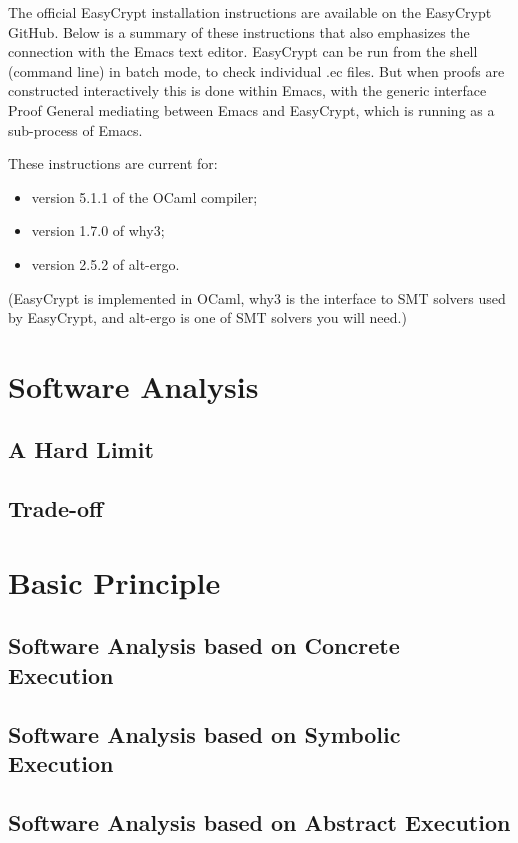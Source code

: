
\cite{StoughtonEasyCrypt}

The official EasyCrypt installation instructions are available on the EasyCrypt GitHub. Below is a summary of these instructions that also emphasizes the connection with the Emacs text editor. EasyCrypt can be run from the shell (command line) in batch mode, to check individual .ec files. But when proofs are constructed interactively this is done within Emacs, with the generic interface Proof General mediating between Emacs and EasyCrypt, which is running as a sub-process of Emacs.

These instructions are current for:
\begin{itemize}
	\item version 5.1.1 of the OCaml compiler;
	\item version 1.7.0 of \textsf{why3};
	\item version 2.5.2 of \textsf{alt-ergo}.
\end{itemize}

(EasyCrypt is implemented in OCaml, \textsf{why3} is the interface to SMT solvers used by EasyCrypt, and \textsf{alt-ergo} is one of SMT solvers you will need.) 

\section{Software Analysis}

\subsection{A Hard Limit}

\subsection{Trade-off}

\section{Basic Principle}
\subsection{Software Analysis based on Concrete Execution}
\subsection{Software Analysis based on Symbolic Execution}
\subsection{Software Analysis based on Abstract Execution}
